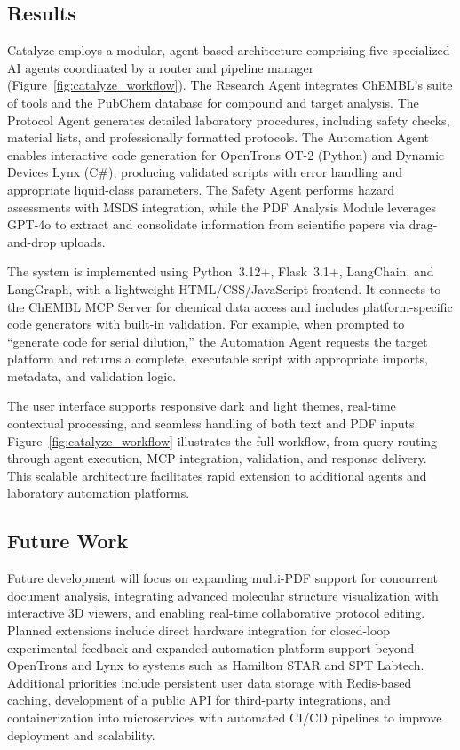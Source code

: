 \subsection*{Results}
Catalyze employs a modular, agent-based architecture comprising five specialized AI agents coordinated by a router and pipeline manager (Figure~\ref{fig:catalyze_workflow}). The Research Agent integrates ChEMBL’s suite of tools and the PubChem database for compound and target analysis. The Protocol Agent generates detailed laboratory procedures, including safety checks, material lists, and professionally formatted protocols. The Automation Agent enables interactive code generation for OpenTrons OT-2 (Python) and Dynamic Devices Lynx (C\#), producing validated scripts with error handling and appropriate liquid-class parameters. The Safety Agent performs hazard assessments with MSDS integration, while the PDF Analysis Module leverages GPT-4o to extract and consolidate information from scientific papers via drag-and-drop uploads.

The system is implemented using Python~3.12+, Flask~3.1+, LangChain, and LangGraph, with a lightweight HTML/CSS/JavaScript frontend. It connects to the ChEMBL MCP Server for chemical data access and includes platform-specific code generators with built-in validation. For example, when prompted to ``generate code for serial dilution,'' the Automation Agent requests the target platform and returns a complete, executable script with appropriate imports, metadata, and validation logic.

The user interface supports responsive dark and light themes, real-time contextual processing, and seamless handling of both text and PDF inputs. Figure~\ref{fig:catalyze_workflow} illustrates the full workflow, from query routing through agent execution, MCP integration, validation, and response delivery. This scalable architecture facilitates rapid extension to additional agents and laboratory automation platforms.

\subsection*{Future Work}
Future development will focus on expanding multi-PDF support for concurrent document analysis, integrating advanced molecular structure visualization with interactive 3D viewers, and enabling real-time collaborative protocol editing. Planned extensions include direct hardware integration for closed-loop experimental feedback and expanded automation platform support beyond OpenTrons and Lynx to systems such as Hamilton STAR and SPT Labtech. Additional priorities include persistent user data storage with Redis-based caching, development of a public API for third-party integrations, and containerization into microservices with automated CI/CD pipelines to improve deployment and scalability.

